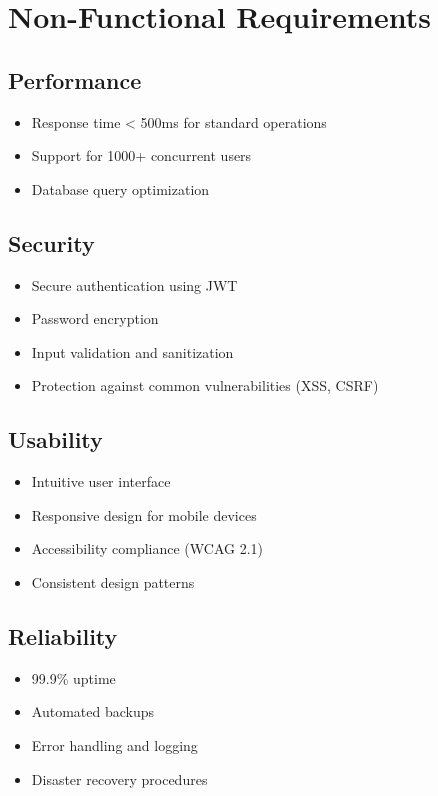 \documentclass[12pt,a4paper]{report}
\begin{document}
\section{Non-Functional Requirements}

\subsection{Performance}
\begin{itemize}[leftmargin=*]
    \item Response time < 500ms for standard operations
    \item Support for 1000+ concurrent users
    \item Database query optimization
\end{itemize}

\subsection{Security}
\begin{itemize}[leftmargin=*]
    \item Secure authentication using JWT
    \item Password encryption
    \item Input validation and sanitization
    \item Protection against common vulnerabilities (XSS, CSRF)
\end{itemize}

\subsection{Usability}
\begin{itemize}[leftmargin=*]
    \item Intuitive user interface
    \item Responsive design for mobile devices
    \item Accessibility compliance (WCAG 2.1)
    \item Consistent design patterns
\end{itemize}

\subsection{Reliability}
\begin{itemize}[leftmargin=*]
    \item 99.9\% uptime
    \item Automated backups
    \item Error handling and logging
    \item Disaster recovery procedures
\end{itemize}
\end{document}

